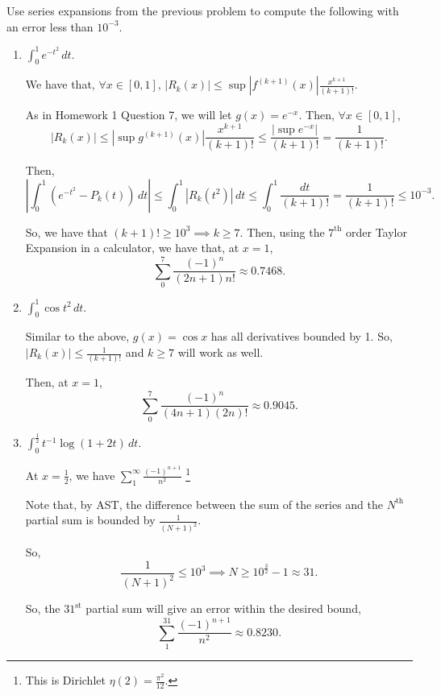 \documentclass[../hw3]{subfiles}
\begin{document}
\begin{problem}
Use series expansions from the previous problem to compute the following with an error less than $10^{-3}$.
\end{problem}
\begin{enumerate}[label=\alph*)]
	\item $\int_{0}^{1} e^{-t^2} \,dt$.

	      We have that, $\forall x \in [0,1],\, |R_k(x)|\le \sup{|f^{(k+1)}(x)|}\frac{x^{k+1}}{(k+1)!}$.

	      As in Homework 1 Question 7, we will let $g(x)=e^{-x}$.
	      Then, $\forall x \in [0,1]$, \[
		      |R_k(x)|\le \left|\sup{g^{(k+1)}(x)}\right|\frac{x^{k+1}}{(k+1)!} \le \frac{|\sup{e^{-x}}|}{(k+1)!}=\frac{1}{(k+1)!}
		      .\]

	      Then, \[
		      \left| \int_{0}^{1} \left( e^{-t^2}-P_k(t) \right)  \,dt \right| \le \int_{0}^{1} |R_k(t^2)| \,dt \le \int_{0}^{1} \frac{dt}{(k+1)!} = \frac{1}{(k+1)!} \le 10^{-3}
		      .\]

	      So, we have that $(k+1)!\ge 10^3 \implies k \ge 7$.
	      Then, using the $7^{\text{th}}$ order Taylor Expansion in a calculator, we have that, at $x=1$, \[
		      \sum_{0}^{7} \frac{(-1)^n}{(2n+1)n!}\approx 0.7468
		      .\]

	\item $\int_{0}^{1} \cos{t^2}  \,dt$.

	      Similar to the above, $g(x)=\cos{x}$ has all derivatives bounded by 1.
	      So, $|R_k(x)|\le \frac{1}{(k+1)!}$ and $k\ge 7$ will work as well.

	      Then, at $x=1$,  \[
		      \sum_{0}^{7} \frac{(-1)^n}{(4n+1)(2n)!}\approx 0.9045
		      .\]

	\item $\int_{0}^{\frac{1}{2}} t^{-1}\log{(1+2t)} \,dt$.

	      At $x=\frac{1}{2}$, we have $\sum_{1}^{\infty} \frac{(-1)^{n+1}}{n^2}$
	      \footnote{This is Dirichlet $\eta (2) = \frac{\pi^2 }{12}$.}

	      Note that, by AST, the difference between the sum of the series and the $N^{\text{th}}$ partial sum is bounded by $ \frac{1}{(N+1)^2}$.

	      So,  \[
		      \frac{1}{(N+1)^2}\le 10^3\implies N \ge 10^{\frac{3}{2}}-1 \approx 31
		      .\]

	      So, the $31^{\text{st}}$ partial sum will give an error within the desired bound, \[
		      \sum_{1}^{31}  \frac{(-1)^{n+1}}{n^2} \approx 0.8230
		      .\]
\end{enumerate}
\end{document}
